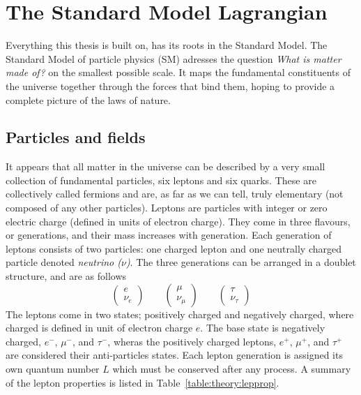 \section{The Standard Model Lagrangian}
Everything this thesis is built on, has its roots in the Standard Model. The Standard Model of particle physics (SM) adresses the question \emph{What is matter made of?} on the smallest possible scale. It maps the fundamental constituents of the universe together through the forces that bind them, hoping to provide a complete picture of the laws of nature.
\subsection{Particles and fields}
It appears that all matter in the universe can be described by a very small collection of fundamental particles, six leptons and six quarks. These are collectively called fermions and are, as far as we can tell, truly elementary (not composed of any other particles).
Leptons are particles with integer or zero electric charge (defined in units of electron charge). They come in three flavours, or generations, and their mass increases with generation. Each generation of leptons consists of two particles: one charged lepton and one neutrally charged particle denoted \emph{neutrino ($\nu$)}. The three generations can be arranged in a doublet structure, and are as follows
\begin{equation}
\label{eqn:lepton_flavor_doublets}
\begin{pmatrix} e       \\ \nu_e      \end{pmatrix} \qquad
\begin{pmatrix} \mu     \\ \nu_{\mu}  \end{pmatrix} \qquad
\begin{pmatrix} \tau    \\ \nu_{\tau} \end{pmatrix}
\end{equation}
The leptons come in two states; positively charged and negatively charged, where charged is defined in unit of electron charge $e$. The base state is negatively charged, $e^{-}$, $\mu^{-}$, and $\tau^{-}$,  wheras the positively charged leptons,  $e^{+}$, $\mu^{+}$, and $\tau^{+}$ are considered their anti-particles states.
Each lepton generation is assigned its own quantum number $L$ which must be conserved after any process. A summary of the lepton properties is listed in Table~\ref{table:theory:lepprop}.
